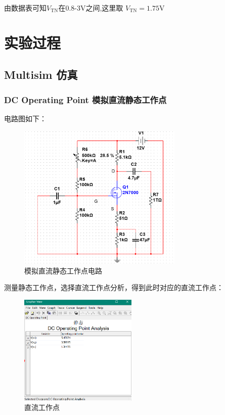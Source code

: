 \documentclass[a4paper,11pt,UTF8]{article}
\numberwithin{equation}{subsection}
\begin{document}
由数据表可知$V_{\mathrm{TN}}$在0.8-3V之间,这里取 $V_{\mathrm{TN}}=1.75\mathrm{V}$

\section{实验过程}

\subsection{Multisim 仿真}

\subsubsection{DC Operating Point 模拟直流静态工作点}
电路图如下：
\begin{figure}[H]
	\centering
	\includegraphics[width=0.7\textwidth]{2.2.png}
	\caption{模拟直流静态工作点电路}
\end{figure}

测量静态工作点，选择直流工作点分析，得到此时对应的直流工作点：
\begin{figure}[H]
	\centering
	\includegraphics[width=0.5\textwidth]{2.3.png}
	\caption{直流工作点}
\end{figure}
\end{document}

